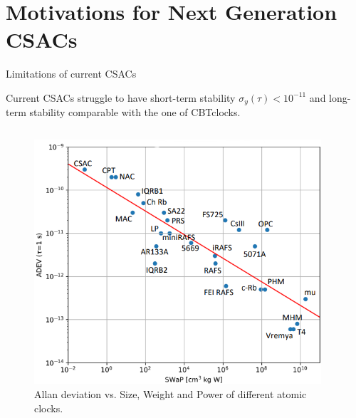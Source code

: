 \section{Motivations for Next Generation CSACs}

\begin{frame}{Limitations of current CSACs}

    Current CSACs struggle to have short-term stability $\sigma_y(\tau) < 10^{-11}$ and long-term stability comparable with the one of CBT\footnotemark[1] clocks.

    \begin{columns}[c, onlytextwidth]

        \begin{column}{0.48\textwidth}

            \begin{figure}
                \centering
                \includegraphics[height=0.4\textheight]{img/ADEV-vs-SWaP.png}
                \caption{Allan deviation vs. Size, Weight and Power of different atomic clocks.}
            \end{figure}

        \end{column}

        \hfill

        \begin{column}{0.48\textwidth}


\end{column}
\end{columns}
\end{frame}
